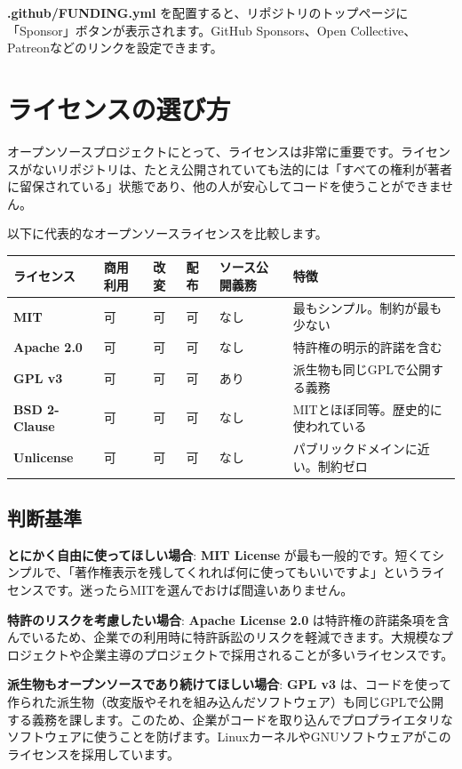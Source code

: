 \textbf{.github/FUNDING.yml} を配置すると、リポジトリのトップページに「Sponsor」ボタンが表示されます。GitHub Sponsors、Open Collective、Patreonなどのリンクを設定できます。

\section{ライセンスの選び方}

オープンソースプロジェクトにとって、ライセンスは非常に重要です。ライセンスがないリポジトリは、たとえ公開されていても法的には「すべての権利が著者に留保されている」状態であり、他の人が安心してコードを使うことができません。

以下に代表的なオープンソースライセンスを比較します。

\begin{table}[h]
\centering
\begin{tabular}{llllll}
\hline
ライセンス & 商用利用 & 改変 & 配布 & ソース公開義務 & 特徴 \\
\hline
\textbf{MIT} & 可 & 可 & 可 & なし & 最もシンプル。制約が最も少ない \\
\textbf{Apache 2.0} & 可 & 可 & 可 & なし & 特許権の明示的許諾を含む \\
\textbf{GPL v3} & 可 & 可 & 可 & あり & 派生物も同じGPLで公開する義務 \\
\textbf{BSD 2-Clause} & 可 & 可 & 可 & なし & MITとほぼ同等。歴史的に使われている \\
\textbf{Unlicense} & 可 & 可 & 可 & なし & パブリックドメインに近い。制約ゼロ \\
\hline
\end{tabular}
\end{table}

\subsection{判断基準}

\textbf{とにかく自由に使ってほしい場合}: \textbf{MIT License} が最も一般的です。短くてシンプルで、「著作権表示を残してくれれば何に使ってもいいですよ」というライセンスです。迷ったらMITを選んでおけば間違いありません。

\textbf{特許のリスクを考慮したい場合}: \textbf{Apache License 2.0} は特許権の許諾条項を含んでいるため、企業での利用時に特許訴訟のリスクを軽減できます。大規模なプロジェクトや企業主導のプロジェクトで採用されることが多いライセンスです。

\textbf{派生物もオープンソースであり続けてほしい場合}: \textbf{GPL v3} は、コードを使って作られた派生物（改変版やそれを組み込んだソフトウェア）も同じGPLで公開する義務を課します。このため、企業がコードを取り込んでプロプライエタリなソフトウェアに使うことを防げます。LinuxカーネルやGNUソフトウェアがこのライセンスを採用しています。

